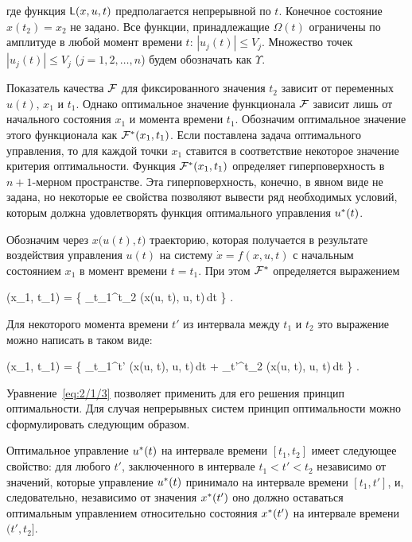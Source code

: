где функция $\mathsf{L}(x, u, t)$ предполагается непрерывной по $t$. Конечное состояние $x(t_2) = x_2$ не задано. Все функции, принадлежащие $\Omega(t)$ ограничены по амплитуде в любой момент времени $t$: $|u_j(t)| \leqslant V_j$. Множество точек $|u_j(t)| \leqslant V_j$ ($j = 1, 2, \ldots, n$) будем обозначать как $\Upsilon$.

Показатель качества $\mathcal{F}$ для фиксированного значения $t_2$ зависит от переменных $u(t)$, $x_1$ и $t_1$. Однако оптимальное значение функционала $\mathcal{F}$ зависит лишь от начального состояния $x_1$ и момента времени $t_1$. Обозначим оптимальное значение этого функционала как $\mathcal{F}^{*}(x_1, t_1)$. Если поставлена задача оптимального управления, то для каждой точки $x_1$ ставится в соответствие некоторое значение критерия оптимальности. Функция $\mathcal{F}^{*}(x_1, t_1)$ определяет гиперповерхность в $n+1$-мерном пространстве. Эта гиперповерхность, конечно, в явном виде не задана, но некоторые ее свойства позволяют вывести ряд необходимых условий, которым должна удовлетворять функция оптимального управления $u^{*}(t)$.

Обозначим через $x \bigl( u(t), t \bigr)$ траекторию, которая получается в результате воздействия управления $u(t)$ на систему $\dot{x} = f(x, u, t)$ с начальным состоянием $x_1$ в момент времени $t = t_1$. При этом $\mathcal{F}^{*}$ определяется выражением

    \optF(x_1, t_1) =  \biggl\{ \int\limits_{t_1}^{t_2} \funcL\bigl(x(u, t), u, t\bigr)\,dt \biggr\} \mbox{.}
\eeq

Для некоторого момента времени $t'$ из интервала между $t_1$ и $t_2$ это выражение можно написать в таком виде:

    \optF(x_1, t_1) =  \biggl\{ \int\limits_{t_1}^{t'} \funcL\bigl(x(u, t), u, t\bigr)\,dt + \int\limits_{t'}^{t_2} \funcL\bigl(x(u, t), u, t\bigr)\,dt \biggr\} \mbox{.}
\eeq

Уравнение~\ref{eq:2/1/3} позволяет применить для его решения принцип оптимальности. Для случая непрерывных систем принцип оптимальности можно сформулировать следующим образом.

\begin{statement}
	Оптимальное управление $u^{*}(t)$ на интервале времени $[t_1, t_2]$ имеет следующее свойство: для любого $t'$, заключенного в интервале $t_1 < t' < t_2$ независимо от значений, которые управление $u^{*}(t)$ принимало на интервале времени $[t_1, t']$, и, следовательно, независимо от значения $x^{*}(t')$ оно должно оставаться оптимальным управлением относительно состояния $x^{*}(t')$ на интервале времени $(t', t_2]$.
\end{statement}

